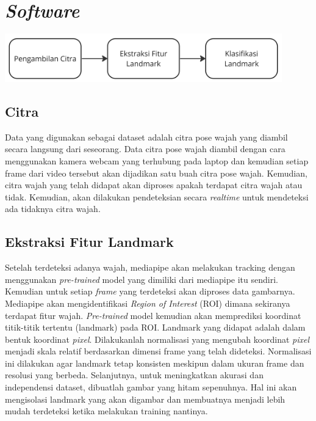 \section{\emph{Software}}

\begin{center}
  \centering
  \includegraphics[width=0.9\textwidth]{gambar/blokdiagramsoftwareidpendek.jpg}
  \label{fig:Blok Diagram}
\end{center}

\subsection{Citra}
Data yang digunakan sebagai dataset adalah citra pose wajah yang diambil secara langsung dari seseorang. Data citra pose wajah diambil dengan cara menggunakan kamera webcam yang terhubung pada laptop dan kemudian setiap frame dari video tersebut akan dijadikan satu buah citra pose wajah. Kemudian, citra wajah yang telah didapat akan diproses apakah terdapat citra wajah atau tidak. Kemudian, akan dilakukan pendeteksian secara \emph{realtime} untuk mendeteksi ada tidaknya citra wajah. 

\subsection{Ekstraksi Fitur Landmark}

Setelah terdeteksi adanya wajah, mediapipe akan melakukan tracking dengan menggunakan \emph{pre-trained} model yang dimiliki dari mediapipe itu sendiri. Kemudian untuk setiap \emph{frame} yang terdeteksi akan diproses data gambarnya. Mediapipe akan mengidentifikasi \emph{Region of Interest} (ROI) dimana sekiranya terdapat fitur wajah. \emph{Pre-trained} model kemudian akan memprediksi koordinat titik-titik tertentu (landmark) pada ROI. Landmark yang didapat adalah dalam bentuk koordinat \emph{pixel}. Dilakukanlah normalisasi yang mengubah koordinat \emph{pixel} menjadi skala relatif berdasarkan dimensi frame yang telah dideteksi. Normalisasi ini dilakukan agar landmark tetap konsisten meskipun dalam ukuran frame dan resolusi yang berbeda. Selanjutnya, untuk meningkatkan akurasi dan independensi dataset, dibuatlah gambar yang hitam sepenuhnya. Hal ini akan mengisolasi landmark yang akan digambar dan membuatnya menjadi lebih mudah terdeteksi ketika melakukan training nantinya.

